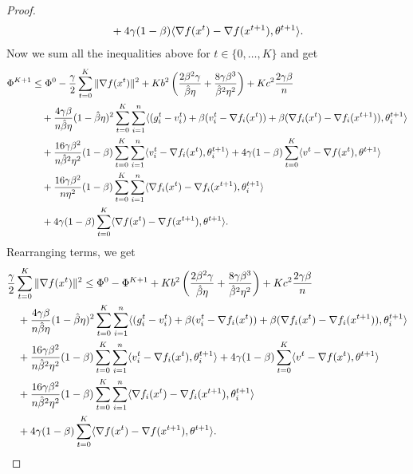 \documentclass[a4paper,11pt]{article}
\begin{document}
\begin{proof}
\begin{align*}
    & \quad + 4\gamma(1-\beta)\<\nabla f(x^t) - \nabla f(x^{t+1}), \theta^{t+1}>.
    \end{align*}
    Now we sum all the inequalities above for $t\in\{0,\dots,K\}$ and get 
    \begin{align}
    \Phi^{K+1} 
    &\le \Phi^0 
    - \frac{\gamma}{2}\sum_{t=0}^{K}\|\nabla f(x^t)\|^2
    + Kb^2\left(\frac{2\beta^2\gamma}{\hat{\beta}\eta} + \frac{8\gamma\beta^3}{\hat{\beta}^2\eta^2} \right)
    + Kc^2\frac{2\gamma\beta}{n} \notag\\
    & \quad + \frac{4\gamma\beta}{n\hat{\beta}\eta}(1-\hat{\beta}\eta)^2\sum_{t=0}^{K}\sum_{i=1}^n\<(g_i^{t} - v_i^{t}) + \beta(v_i^{t} - \nabla f_i(x^{t})) + \beta(\nabla f_i(x^{t})-\nabla f_i(x^{t+1})), \theta^{t+1}_i>\notag\\
    &\quad + \frac{16\gamma\beta^2}{n\hat{\beta}^2\eta^2}(1-\beta)\sum_{t=0}^{K}\sum_{i=1}^n\<v_i^t - \nabla f_i(x^{t}), \theta^{t+1}_i>
    + 4\gamma(1-\beta)\sum_{t=0}^{K}\<v^t - \nabla f(x^{t}), \theta^{t+1}>\notag\\
    &\quad + \frac{16\gamma\beta^2}{n\eta^2}(1-\beta)\sum_{t=0}^{K}\sum_{i=1}^n\<\nabla f_i(x^t) - \nabla f_i(x^{t+1}), \theta^{t+1}_i>\notag\\
    & \quad + 4\gamma(1-\beta)\sum_{t=0}^{K}\<\nabla f(x^t) - \nabla f(x^{t+1}), \theta^{t+1}>.\label{eq:njqnsfqknj}
    \end{align}
    Rearranging terms, we get
    \begin{align*}
    &\frac{\gamma}{2}\sum_{t=0}^{K}\|\nabla f(x^t)\|^2
    \le \Phi^0 - \Phi^{K+1}
    + K b^2\left(\frac{2\beta^2\gamma}{\hat{\beta}\eta} + \frac{8\gamma\beta^3}{\hat{\beta}^2\eta^2}\right)
    + Kc^2\frac{2\gamma\beta}{n}\\
    & \quad + \frac{4\gamma\beta}{n\hat{\beta}\eta}(1-\hat{\beta}\eta)^2\sum_{t=0}^{K}\sum_{i=1}^n\<(g_i^{t} - v_i^{t}) + \beta(v_i^{t} - \nabla f_i(x^{t})) + \beta(\nabla f_i(x^{t})-\nabla f_i(x^{t+1})), \theta^{t+1}_i>\\
    &\quad + \frac{16\gamma\beta^2}{n\hat{\beta}^2\eta^2}(1-\beta)\sum_{t=0}^{K}\sum_{i=1}^n\<v_i^t - \nabla f_i(x^{t}), \theta^{t+1}_i>
    + 4\gamma(1-\beta)\sum_{t=0}^{K}\<v^t - \nabla f(x^{t}), \theta^{t+1}>\\
    &\quad + \frac{16\gamma\beta^2}{n\hat{\beta}^2\eta^2}(1-\beta)\sum_{t=0}^{K}\sum_{i=1}^n\<\nabla f_i(x^t) - \nabla f_i(x^{t+1}), \theta^{t+1}_i>\\
    & \quad + 4\gamma(1-\beta)\sum_{t=0}^{K}\<\nabla f(x^t) - \nabla f(x^{t+1}), \theta^{t+1}>.
    \end{align*}

\end{proof}
\end{document}
